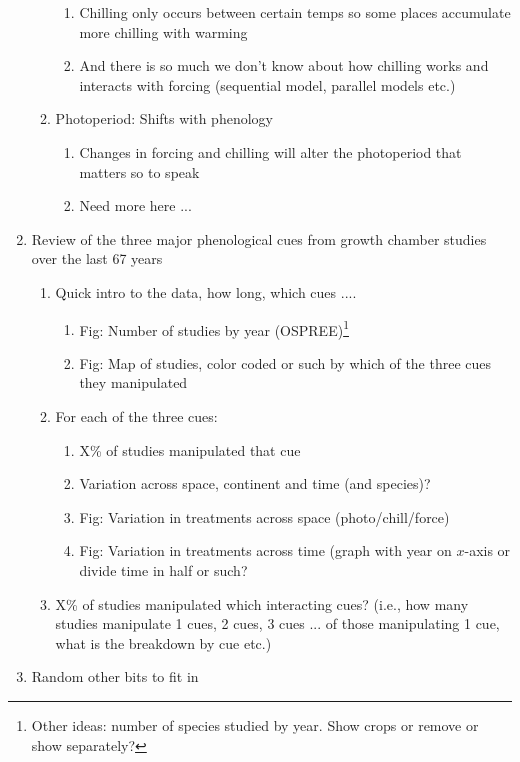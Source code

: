 \documentclass[11pt,letterpaper]{article}
\begin{document}
\begin{enumerate}
\begin{enumerate}
\begin{enumerate}
\item Chilling only occurs between certain temps so some places accumulate more chilling with warming
\item And there is so much we don't know about how chilling works and interacts with forcing (sequential model, parallel models etc.)
\end{enumerate}
\item Photoperiod: Shifts with phenology
\begin{enumerate}
\item Changes in forcing and chilling will alter the photoperiod that matters so to speak
\item Need more here ... 
\end{enumerate}
\end{enumerate}
\item Review of the three major phenological cues from growth chamber studies over the last 67 years %
\begin{enumerate}
\item Quick intro to the data, how long, which cues .... 
\begin{enumerate}
\item Fig: Number of studies by year (OSPREE)\footnote{Other ideas: number of species studied by year. Show crops or remove or show separately?}
\item Fig: Map of studies, color coded or such by which of the three cues they manipulated
\end{enumerate}
\item For each of the three cues:
\begin{enumerate}
\item  X\% of studies manipulated that cue
\item Variation across space, continent and time (and species)? 
\item Fig: Variation in treatments across space (photo/chill/force)
\item Fig: Variation in treatments across time (graph with year on $x$-axis or divide time in half or such? 
\end{enumerate}
\item X\% of studies manipulated which interacting cues? (i.e., how many studies manipulate 1 cues, 2 cues, 3 cues ... of those manipulating 1 cue, what is the breakdown by cue etc.)
\end{enumerate}
\item Random other bits to fit in
\begin{enumerate}

\end{enumerate}
\end{enumerate}
\end{document}
